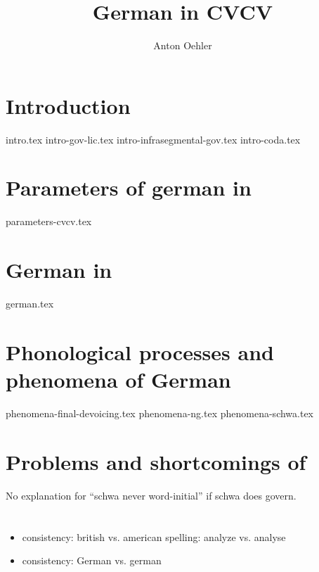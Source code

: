 \documentclass[
]{scrartcl}
\title{German in CVCV}
\author{Anton Oehler}
\begin{document}
\maketitle


\tableofcontents

\section{Introduction}
{intro.tex}
{intro-gov-lic.tex}
{intro-infrasegmental-gov.tex}
{intro-coda.tex}


\section{Parameters of german in \CVCV}
{parameters-cvcv.tex}


\section{German in \CVCV}
{german.tex}


\section{Phonological processes and phenomena of German}
{phenomena-final-devoicing.tex}
{phenomena-ng.tex}
{phenomena-schwa.tex}

\section{Problems and shortcomings of \CVCV}
No explanation for \enquote{schwa never word-initial} if schwa does govern.


\section*{\TODO{}}
\begin{itemize}
\item consistency: british vs. american spelling: analyze vs. analyse
\item consistency: German vs. german
\end{itemize}

\printbibliography
\end{document}
